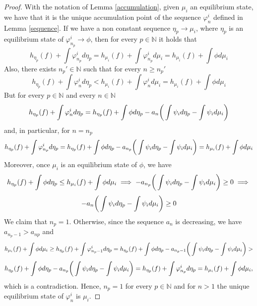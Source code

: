 \documentclass[10pt,a4paper]{amsart}
\begin{document}
\begin{proof}
	With the notation of Lemma \ref{accumulation}, given $\mu_{i}$ an equilibrium state, we have that it is the unique accumulation point of the sequence $\varphi_{n}^{i}$ defined in Lemma \ref{sequence}. If we have a non constant sequence $\eta_{p} \to \mu_{i}$, where $\eta_{p}$ is an equilibrium state of $\varphi_{n_{p}}^{i} \to \phi$, then for every $p \in \mathbb{N}$ it holds that
	\[
	h_{\eta_{p}}(f) + \int \varphi_{n_{p}}^{i} d\eta_{p} = h_{\mu_{i}}(f) + \int \varphi_{n_{p}}^{i} d\mu_{i} = h_{\mu_{i}}(f) + \int \phi d\mu_{i}
	\]
	Also, there exists $n_{p}' \in \mathbb{N}$ such that for every $n \geq n_{p}'$
	\[
	h_{\eta_{p}}(f) + \int \varphi_{n}^{i} d\eta_{p} < h_{\mu_{i}}(f) + \int \varphi_{n}^{i} d\mu_{i} = h_{\mu_{i}}(f) + \int \phi d\mu_{i}
	\]
	But for every $p \in \mathbb{N}$ and every $n \in \mathbb{N}$
	\[
	h_{\eta_{p}}(f) + \int \varphi_{n}^{i} d\eta_{p} = h_{\eta_{p}}(f) + \int \phi d\eta_{p} - a_{n}\bigg{(}\int \psi_{i}d\eta_{p} - \int \psi_{i} d\mu_{i}\bigg{)}
	\]
	and, in particular, for $n = n_{p}$
	\[
	h_{\eta_{p}}(f) + \int \varphi_{n_{p}}^{i} d\eta_{p} = h_{\eta_{p}}(f) + \int \phi d\eta_{p} - a_{n_{p}}\bigg{(}\int \psi_{i}d\eta_{p} - \int \psi_{i} d\mu_{i}\bigg{)} = h_{\mu_{i}}(f) + \int \phi d\mu_{i}
	\]
	Moreover, once $\mu_{i}$ is an equilibrium state of $\phi$, we have
	\[
	h_{\eta_{p}}(f) + \int \phi d\eta_{p} \leq h_{\mu_{i}}(f) + \int \phi d\mu_{i} \implies - a_{n_{p}}\bigg{(}\int \psi_{i}d\eta_{p} - \int \psi_{i} d\mu_{i}\bigg{)} \geq 0 \implies 
	\]
	\[
	-a_{n}\bigg{(}\int \psi_{i}d\eta_{p} - \int \psi_{i} d\mu_{i}\bigg{)} \geq 0
	\]
	We claim that $n_{p} = 1$. Otherwise, since the sequence $a_{n}$ is decreasing, we have $a_{n_{p} -1} > a_{n{p}}$ and
	\[
	h_{\mu_{i}}(f) + \int \phi d\mu_{i} \geq h_{\eta_{p}}(f) + \int \varphi_{n_{p}-1}^{i} d\eta_{p} = h_{\eta_{p}}(f) + \int \phi d\eta_{p} - a_{n_{p}-1}\bigg{(}\int \psi_{i}d\eta_{p} - \int \psi_{i} d\mu_{i}\bigg{)} > 
	\]
	\[
	h_{\eta_{p}}(f) + \int \phi d\eta_{p} - a_{n_{p}}\bigg{(}\int \psi_{i}d\eta_{p} - \int \psi_{i} d\mu_{i}\bigg{)} = h_{\eta_{p}}(f) + \int \varphi_{n_{p}}^{i} d\eta_{p} = h_{\mu_{i}}(f) + \int \phi d\mu_{i},
	\]
	which is a contradiction. Hence, $n_{p} =1$ for every $p \in \mathbb{N}$ and for $n > 1$ the unique equilibrium state of $\varphi_{n}^{i}$ is $\mu_{i}$.
\end{proof}
\end{document}
